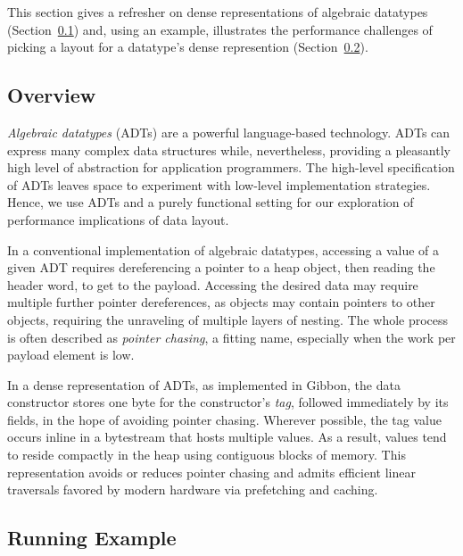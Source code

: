 \documentclass[acmsmall,review,anonymous]{acmart}\settopmatter{printfolios=true,printccs=false,printacmref=false}
\newcommand{\mk}[1]{\pgwrapper{MK}{#1}} \newcommand{\ls}[1]{\pgwrapper{LS}{#1}} \newcommand{\vs}[1]{\pgwrapper{VS}{#1} } \newcommand{\ap}[1]{\pgwrapper{AP}{#1} }
\newcommand{\pgwrapper}[2]{\todo[size=\tiny]{#1: #2}}
\newcommand{\pgwrapper}[2]{}
\newcommand{\secref}[1]{Section~\ref{#1}}
\newcommand{\Secref}[1]{\secref{#1}}
\newcommand{\gibbon}{{\sc Gibbon}\xspace}
\begin{document}
This section gives a refresher on dense representations of algebraic datatypes (\Secref{sec:overview:overview})
and, using an example, illustrates the performance challenges of picking a
layout for a datatype's dense represention (\Secref{sec:overview:example}).

\subsection{Overview}\label{sec:overview:overview}

\emph{Algebraic datatypes} (ADTs) are a powerful language-based technology. ADTs can
express many complex data structures while, nevertheless, providing a
pleasantly high level of abstraction for application programmers.
The high-level specification of ADTs leaves
space to experiment with low-level implementation strategies. Hence, we use ADTs
and a purely functional setting for our exploration of performance implications of
data layout.

In a conventional implementation of algebraic datatypes, accessing a value of a
given ADT requires dereferencing a pointer to a heap object, then reading the
header word, to get to the payload.
Accessing the desired data may require multiple further pointer dereferences, as objects
may contain pointers to other objects, requiring the unraveling of multiple layers of nesting.
The whole process is often described as \emph{pointer chasing}, a fitting name, 
especially when the work per payload element is low.

In a dense representation of ADTs, as implemented in \gibbon{},
the data constructor stores
one byte for the constructor's {\em tag}, followed immediately by its fields,
in the hope of avoiding pointer chasing.
Wherever possible, the tag value occurs inline in a bytestream that
hosts multiple values.
As a result, values tend to reside compactly in the heap\mk{RAM feels a little low-level for this} using contiguous blocks of
memory. This representation avoids or reduces pointer chasing and admits
efficient linear traversals favored by modern hardware via
prefetching and caching.




\subsection{Running Example}\label{sec:overview:example}
\end{document}
